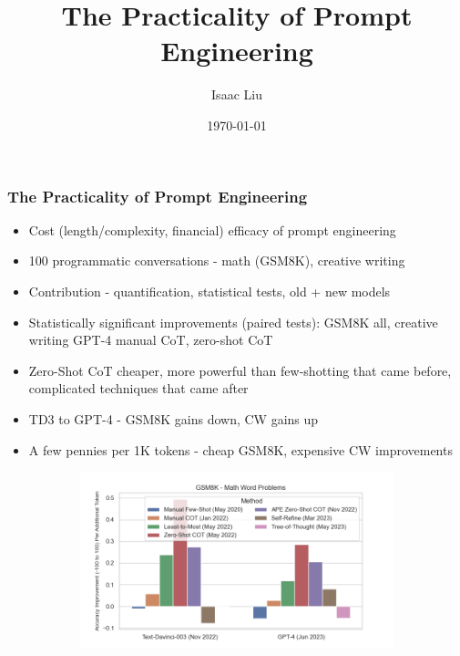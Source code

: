\documentclass{beamer}
\title[The Practicality of Prompt Engineering]{The Practicality of Prompt Engineering}
\author{Isaac Liu}
\date{\today}
\begin{document}
    \begin{frame}
        \frametitle{The Practicality of Prompt Engineering}
        \begin{itemize}
            \scriptsize
            \item Cost (length/complexity, financial) efficacy of prompt engineering
            \item 100 programmatic conversations - math (GSM8K), creative writing
            \item Contribution - quantification, statistical tests, old + new models
            \item Statistically significant improvements (paired tests): GSM8K all, creative writing GPT-4 manual CoT, zero-shot CoT
            \item Zero-Shot CoT cheaper, more powerful than few-shotting that came before, complicated techniques that came after
            \item TD3 to GPT-4 - GSM8K gains down, CW gains up
            \item A few pennies per 1K tokens - cheap GSM8K, expensive CW improvements
        \end{itemize}
        \begin{figure}[h]
            \begin{subfigure}[h]{0.4925\textwidth}
                \centering
                \includegraphics[width=1.1\hsize]{../Output/gsm8k_change_in_accuracy_quality_per_change_in_conversation_length_sorted_by_technique_age.png} 
            \end{subfigure}
            \begin{subfigure}[h]{0.4925\textwidth}

\end{subfigure}
\end{figure}
\end{frame}
\end{document}
